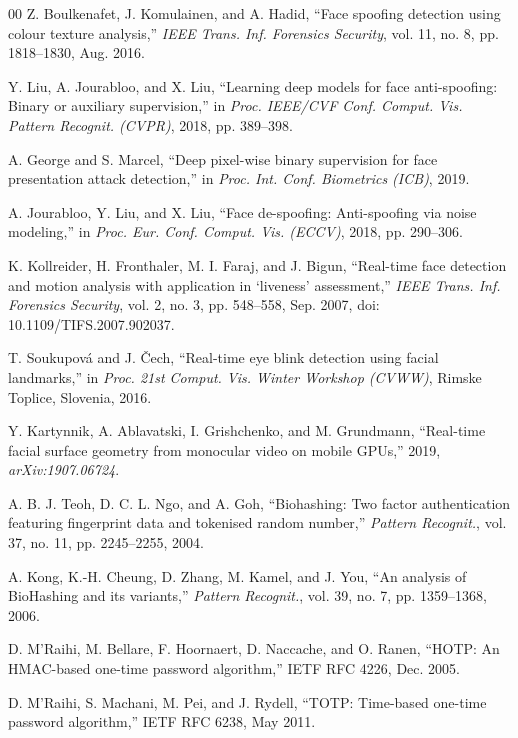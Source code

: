 \documentclass{ieeeaccess}
\begin{document}
\begin{thebibliography}{00}
 Z. Boulkenafet, J. Komulainen, and A. Hadid, ``Face spoofing detection using
colour texture analysis,'' \emph{IEEE Trans. Inf. Forensics Security}, vol. 11, no. 8,
pp. 1818--1830, Aug. 2016.

 Y. Liu, A. Jourabloo, and X. Liu, ``Learning deep models for face anti-spoofing:
Binary or auxiliary supervision,'' in \emph{Proc. IEEE/CVF Conf. Comput. Vis. Pattern Recognit.
(CVPR)}, 2018, pp. 389--398.

 A. George and S. Marcel, ``Deep pixel-wise binary supervision for face
presentation attack detection,'' in \emph{Proc. Int. Conf. Biometrics (ICB)}, 2019.

 A. Jourabloo, Y. Liu, and X. Liu, ``Face de-spoofing: Anti-spoofing via noise
modeling,'' in \emph{Proc. Eur. Conf. Comput. Vis. (ECCV)}, 2018, pp. 290--306.

 K. Kollreider, H. Fronthaler, M. I. Faraj, and J. Bigun, ``Real-time face
detection and motion analysis with application in `liveness' assessment,'' \emph{IEEE Trans. Inf.
Forensics Security}, vol. 2, no. 3, pp. 548--558, Sep. 2007, doi: 10.1109/TIFS.2007.902037.

 T. Soukupov\'{a} and J. \v{C}ech, ``Real-time eye blink detection using facial
landmarks,'' in \emph{Proc. 21st Comput. Vis. Winter Workshop (CVWW)}, Rimske Toplice, Slovenia, 2016.

 Y. Kartynnik, A. Ablavatski, I. Grishchenko, and M. Grundmann, ``Real-time
facial surface geometry from monocular video on mobile GPUs,'' 2019, \emph{arXiv:1907.06724}.

 A. B. J. Teoh, D. C. L. Ngo, and A. Goh, ``Biohashing: Two factor authentication
featuring fingerprint data and tokenised random number,'' \emph{Pattern Recognit.}, vol. 37, no. 11,
pp. 2245--2255, 2004.

 A. Kong, K.-H. Cheung, D. Zhang, M. Kamel, and J. You, ``An analysis of BioHashing
and its variants,'' \emph{Pattern Recognit.}, vol. 39, no. 7, pp. 1359--1368, 2006.  %

 D. M'Raihi, M. Bellare, F. Hoornaert, D. Naccache, and O. Ranen, ``HOTP: An
HMAC-based one-time password algorithm,'' IETF RFC 4226, Dec. 2005.

 D. M'Raihi, S. Machani, M. Pei, and J. Rydell, ``TOTP: Time-based one-time password
algorithm,'' IETF RFC 6238, May 2011.


\end{thebibliography}
\end{document}
